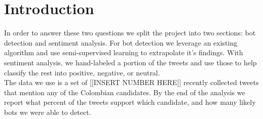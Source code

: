 \documentclass[10pt,a4paper]{article} %
\begin{document}
	\pagestyle{plain}
	\title{\rmfamily\normalfont{}}
	\author{ \\ }
	\date{} %
	
	\maketitle
	
	\begin{abstract}
		\noindent Between May and June of 2018 the people of Colombia will vote for their next president.  As with any modern election, people are using Twitter, the social media platform, to support candidates they like, discredit the others, and debate who should win.  Twitter provides a massive open forum to create dialogue across the country.  Some groups take advantage of this by creating \textit{social bots}, which automatically post political tweets to in an attempt to sway votors \cite{swaine_2018}.  In our project, we use the text mining skills gained in this course to assess the influence of these bots.  We hope to answer two questions: how many bots are there and who are they supporting?
		
	\end{abstract}
	
	\section{Introduction}
		In order to answer these two questions we split the project into two sections:  bot detection and sentiment analysis.  For bot detection we leverage an existing algorithm and use semi-supervised learning to extrapolate it's findings.  With sentiment analysis, we hand-labeled a portion of the tweets and use those to help classify the rest into positive, negative, or neutral. \\
		
		\noindent The data we use is a set of [[INSERT NUMBER HERE]] recently collected tweets that mention any of the Colombian candidates.  By the end of the analysis we report what percent of the tweets support which candidate, and how many likely bots we were able to detect.
\end{document}
